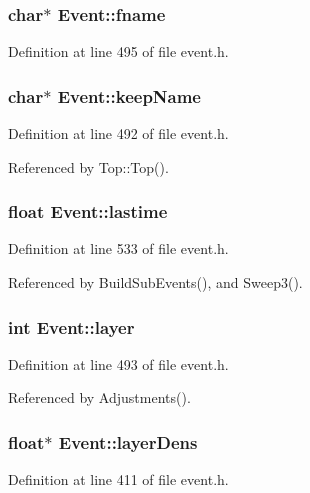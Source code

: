 \subsubsection{\setlength{\rightskip}{0pt plus 5cm}char$\ast$ {\bf Event::fname}}\label{classEvent_o48}




Definition at line 495 of file event.h.
\subsubsection{\setlength{\rightskip}{0pt plus 5cm}char$\ast$ {\bf Event::keep\-Name}}\label{classEvent_o46}




Definition at line 492 of file event.h.

Referenced by Top::Top().
\subsubsection{\setlength{\rightskip}{0pt plus 5cm}float {\bf Event::lastime}\hspace{0.3cm}{\tt  [protected]}}\label{classEvent_p11}




Definition at line 533 of file event.h.

Referenced by Build\-Sub\-Events(), and Sweep3().
\subsubsection{\setlength{\rightskip}{0pt plus 5cm}int {\bf Event::layer}}\label{classEvent_o47}




Definition at line 493 of file event.h.

Referenced by Adjustments().
\subsubsection{\setlength{\rightskip}{0pt plus 5cm}float$\ast$ {\bf Event::layer\-Dens}}\label{classEvent_o32}




Definition at line 411 of file event.h.

